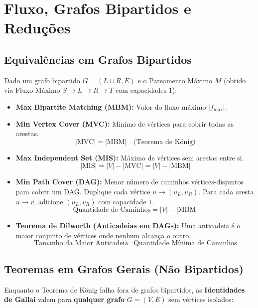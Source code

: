 \section{Fluxo, Grafos Bipartidos e Reduções}

\subsection{Equivalências em Grafos Bipartidos}
Dado um grafo bipartido $G = (L \cup R, E)$ e o Pareamento Máximo $M$ (obtido via Fluxo Máximo $S \to L \to R \to T$ com capacidades $1$):

\begin{itemize}
    \item \textbf{Max Bipartite Matching (MBM):} Valor do fluxo máximo $|f_{\text{max}}|$.
    \item \textbf{Min Vertex Cover (MVC):} Mínimo de vértices para cobrir todas as arestas.
    \[ |\text{MVC}| = |\text{MBM}| \quad \text{(Teorema de König)} \]
    \item \textbf{Max Independent Set (MIS):} Máximo de vértices sem arestas entre si.
    \[ |\text{MIS}| = |V| - |\text{MVC}| = |V| - |\text{MBM}| \]
    \item \textbf{Min Path Cover (DAG):} Menor número de caminhos vértices-disjuntos para cobrir um DAG.
    Duplique cada vértice $u \to (u_L, u_R)$. Para cada aresta $u \to v$, adicione $(u_L, v_R)$ com capacidade $1$.
    \[ \text{Quantidade de Caminhos} = |V| - |\text{MBM}| \]
    \item \textbf{Teorema de Dilworth (Anticadeias em DAGs):} 
    Uma anticadeia é o maior conjunto de vértices onde nenhum alcança o outro.
    \[ \text{Tamanho da Maior Anticadeia} = \text{Quantidade Mínima de Caminhos} \]
\end{itemize}

\subsection{Teoremas em Grafos Gerais (Não Bipartidos)}
Enquanto o Teorema de König falha fora de grafos bipartidos, as \textbf{Identidades de Gallai} valem para \textbf{qualquer grafo} $G = (V, E)$ sem vértices isolados:

